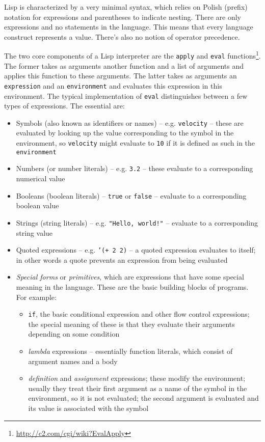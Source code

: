 Lisp is characterized by a very minimal syntax, which relies on Polish (prefix) notation for expressions and parentheses to indicate nesting. There are only expressions and no statements in the language. This means that every language construct represents a value. There's also no notion of operator precedence.

The two core components of a Lisp interpreter are the \texttt{apply} and \texttt{eval} functions\cite{sicp_meta}\footnote{\url{http://c2.com/cgi/wiki?EvalApply}}. The former takes as arguments another function and a list of arguments and applies this function to these arguments. The latter takes as arguments an \texttt{expression} and an \texttt{environment} and evaluates this expression in this environment. The typical implementation of \texttt{eval} distinguishes between a few types of expressions. The essential are:
\begin{itemize}
	\item Symbols (also known as identifiers or names) -- e.g. \texttt{velocity} -- these are evaluated by looking up the value corresponding to the symbol in the environment, so \texttt{velocity} might evaluate to \texttt{10} if it is defined as such in the \texttt{environment}
	\item Numbers (or number literals) -- e.g. \texttt{3.2} -- these evaluate to a corresponding numerical value
	\item Booleans (boolean literals) -- \texttt{true} or \texttt{false} -- evaluate to a corresponding boolean value
	\item Strings (string literals) -- e.g. \texttt{"Hello, world!"} -- evaluate to a corresponding string value
	\item Quoted expressions -- e.g. \texttt{'(+ 2 2)} -- a quoted expression evaluates to itself; in other words a quote prevents an expression from being evaluated
	\item \textit{Special forms} or \textit{primitives}, which are expressions that have some special meaning in the language. These are the basic building blocks of programs. For example:
	\begin{itemize}
		\item \texttt{if}, the basic conditional expression and other flow control expressions; the special meaning of these is that they evaluate their arguments depending on some condition
		\item \textit{lambda} expressions -- essentially function literals, which consist of argument names and a body
		\item \textit{definition} and \textit{assignment} expressions; these modify the environment; usually they treat their first argument as a name of the symbol in the environment, so it is not evaluated; the second argument is evaluated and its value is associated with the symbol 
	\end{itemize}	 
\end{itemize}

